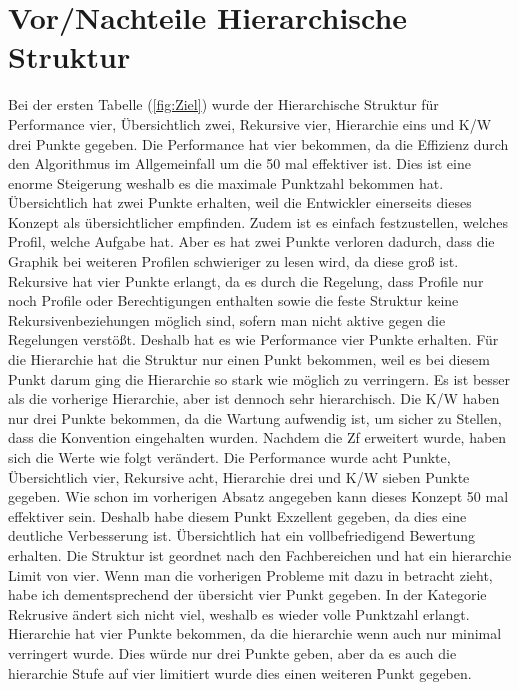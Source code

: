 \section{Vor/Nachteile Hierarchische Struktur}
\label{sec:chapter05:Hierarchische}
Bei der ersten Tabelle (\ref{fig:Ziel}) wurde der Hierarchische Struktur für Performance vier, Übersichtlich zwei, Rekursive vier, Hierarchie eins und \ac{K/W} drei Punkte gegeben.
Die Performance hat vier bekommen, da die Effizienz durch den Algorithmus im Allgemeinfall um die 50 mal effektiver ist.
Dies ist eine enorme Steigerung weshalb es die maximale Punktzahl bekommen hat.
Übersichtlich hat zwei Punkte erhalten, weil die Entwickler einerseits dieses Konzept als übersichtlicher empfinden.
Zudem ist es einfach festzustellen, welches Profil, welche Aufgabe hat.
Aber es hat zwei Punkte verloren dadurch, dass die Graphik bei weiteren Profilen schwieriger zu lesen wird, da diese groß ist.
Rekursive hat vier Punkte erlangt, da es durch die Regelung, dass Profile nur noch Profile oder Berechtigungen enthalten sowie die feste Struktur keine Rekursivenbeziehungen möglich sind, sofern man nicht aktive gegen die Regelungen verstößt.
Deshalb hat es wie Performance vier Punkte erhalten.
Für die Hierarchie hat die Struktur nur einen Punkt bekommen, weil es bei diesem Punkt darum ging die Hierarchie so stark wie möglich zu verringern.
Es ist besser als die vorherige Hierarchie, aber ist dennoch sehr hierarchisch.
Die \ac{K/W} haben nur drei Punkte bekommen, da die Wartung aufwendig ist, um sicher zu Stellen, dass die Konvention eingehalten wurden.
\newline
\newline
Nachdem die \ac{Zf} erweitert wurde, haben sich die Werte wie folgt verändert.
Die Performance wurde acht Punkte, Übersichtlich vier, Rekursive acht, Hierarchie drei und \ac{K/W} sieben Punkte gegeben.
Wie schon im vorherigen Absatz angegeben kann dieses Konzept 50 mal effektiver sein.
Deshalb habe diesem Punkt Exzellent gegeben, da dies eine deutliche Verbesserung ist.
Übersichtlich hat ein vollbefriedigend Bewertung erhalten.
Die Struktur ist geordnet nach den Fachbereichen und hat ein hierarchie Limit von vier.
Wenn man die vorherigen Probleme mit dazu in betracht zieht, habe ich dementsprechend der übersicht vier Punkt gegeben.
In der Kategorie Rekrusive ändert sich nicht viel, weshalb es wieder volle Punktzahl erlangt.
Hierarchie hat vier Punkte bekommen, da die hierarchie wenn auch nur minimal verringert wurde.
Dies würde nur drei Punkte geben, aber da es auch die hierarchie Stufe auf vier limitiert wurde dies einen weiteren Punkt gegeben.
